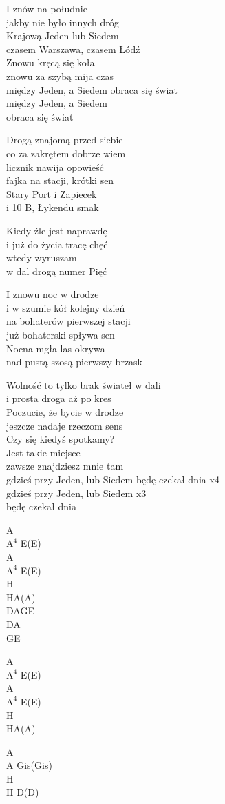 \begin{text}
I znów na południe\\
jakby nie było innych dróg\\
Krajową Jeden lub Siedem\\
czasem Warszawa, czasem Łódź\\
Znowu kręcą się koła\\
znowu za szybą mija czas\\
\vin między Jeden, a Siedem obraca się świat\\
\vin między Jeden, a Siedem\\
\vin obraca się świat

Drogą znajomą przed siebie\\
co za zakrętem dobrze wiem\\
licznik nawija opowieść\\
fajka na stacji, krótki sen\\
Stary Port i Zapiecek\\
i 10 B, Łykendu smak

Kiedy źle jest naprawdę\\
i już do życia tracę chęć\\
wtedy wyruszam\\
w dal drogą numer Pięć

I znowu noc w drodze\\
i w szumie kół kolejny dzień\\
na bohaterów pierwszej stacji\\
już bohaterski spływa sen\\
Nocna mgła las okrywa\\
nad pustą szosą pierwszy brzask

Wolność to tylko brak świateł w dali\\
i prosta droga aż po kres\\
Poczucie, że bycie w drodze\\
jeszcze nadaje rzeczom sens\\
Czy się kiedyś spotkamy?\\
Jest takie miejsce\\
zawsze znajdziesz mnie tam\\
gdzieś przy Jeden, lub Siedem będę czekał dnia	x4\\
gdzieś przy Jeden, lub Siedem			x3\\
będę czekał dnia
\end{text}
\begin{chord}
    A\\
    $\mathrm{A^4}$ E(E)\\
    A\\
    $\mathrm{A^4}$ E(E)\\
    H\\
    HA(A)\\
    DAGE\\
    DA\\
    GE

    A\\
    $\mathrm{A^4}$ E(E)\\
    A\\
    $\mathrm{A^4}$ E(E)\\
    H\\
    HA(A)

    A\\
    A Gis(Gis)\\
    H\\
    H D(D)
\end{chord}
